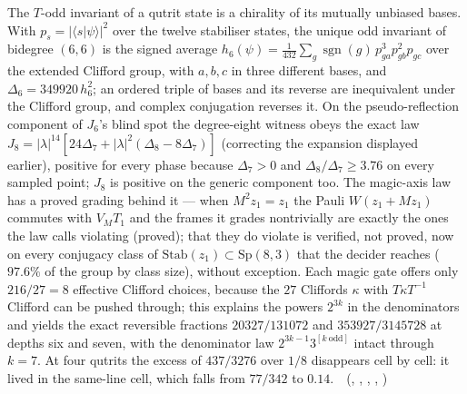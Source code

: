 The $T$-odd invariant of a qutrit state is a chirality of its mutually unbiased bases. With $p_s=\lvert\langle s|\psi\rangle\rvert^2$ over
the twelve stabiliser states, the unique odd invariant of bidegree $(6,6)$ is the signed average
$h_6(\psi)=\frac1{432}\sum_g\operatorname{sgn}(g)\,p_{ga}^3p_{gb}^2p_{gc}$ over the extended Clifford group, with $a,b,c$ in three
different bases, and $\Delta_6=349920\,h_6^2$; an ordered triple of bases and its reverse are inequivalent under the Clifford group,
and complex conjugation reverses it. On the pseudo-reflection component of $J_6$'s blind spot the degree-eight witness obeys the
exact law $J_8=\lvert\lambda\rvert^{14}[24\Delta_7+\lvert\lambda\rvert^2(\Delta_8-8\Delta_7)]$ (correcting the expansion displayed earlier), positive for
every phase because $\Delta_7>0$ and $\Delta_8/\Delta_7\ge3.76$ on every sampled point; $J_8$ is positive on the generic component too.
The magic-axis law has a proved grading behind it --- when $M^2z_1=z_1$ the Pauli $W(z_1+Mz_1)$ commutes with $V_MT_1$ and the
frames it grades nontrivially are exactly the ones the law calls violating (proved); that they do violate is verified, not
proved, now on every conjugacy class of $\mathrm{Stab}(z_1)\subset\mathrm{Sp}(8,3)$ that the decider reaches ($97.6\%$ of the group by
class size), without exception. Each magic gate offers
only $216/27=8$ effective Clifford choices, because the $27$ Cliffords $\kappa$ with $T\kappa T^{-1}$ Clifford can be pushed
through; this explains the powers $2^{3k}$ in the denominators and yields the exact reversible fractions $20327/131072$ and
$353927/3145728$ at depths six and seven, with the denominator law $2^{3k-1}3^{[k\ \mathrm{odd}]}$ intact through $k=7$. At four
qutrits the excess of $437/3276$ over $1/8$ disappears cell by cell: it lived in the same-line cell, which falls from
$77/342$ to $0.14$. \tierT\,\tierC\ (, ,
, , )

